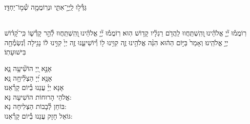 \documentclass[twoside, openany, parskip=half, 11pt]{book}
\begin{document}
\shatz
גַּדְּ֯ל֣וּ לַֽיְיָ֣־אִתִּ֑י וּנְרֽוֹמֲמָ֖ה שְׁ֯מ֣וֹ־יַחְדָּֽו׃

\\
רֽוֹמֲמ֡וּ יְ֘יָ֤ אֱלֹהֵ֗ינוּ ֖וְהִֽשְׁתַּֽחֲווּ לַֽהֲדֹ֥ם רַגְלָ֗יו קָד֥וֹשׁ הֽוּא׃
רֽוֹמֲמ֡וּ יְ֘יָ֤ אֱלֹהֵ֗ינוּ ֖וְהִֽשְׁתַּֽחֲווּ לְ֯הַ֣ר קָדְ֯שׁ֑וֹ כִּֽי־קָ֝ד֗וֹשׁ יְיָ֥ אֱלֹהֵֽינוּ׃
וְאָמַר֙ בַּיּ֣וֹם הַה֔וּא הִנֵּ֨ה אֱלֹהֵ֥ינוּ זֶ֛ה קִוִּ֥ינוּ ל֖וֹ וְ֯יוֹשִׁיעֵ֑נוּ זֶ֤ה יְיָ֙ קִוִּ֣ינוּ ל֔וֹ נָגִ֥ילָה וְ֯נִשְׂמְ֯חָ֖ה בִּישׁוּעָתֽוֹ׃



אָנָּ֣א יְ֭יָ הוֹשִׁ֘יעָ֥ה נָּ֑א\\
אָנָּ֥א יְ֝יָ הַצְלִ֘יחָ֥ה נָּֽא׃\\
אָנָּא יְיָ֗ עֲנֵנוּ בְ֯יוֹם קָרְ֯אֵנוּ׃\\

אֱלֹהֵי הָרוּחוֹת הוֹשִׁיעָה נָּא:\\ בּוֹחֵן לְ֯בָבוֹת הַצְלִיחָה נָא:\\ גּוֹאֵל חָזָק עֲנֵנוּ בְ֯יוֹם קָרְ֯אֵנוּ:


\end{document}
